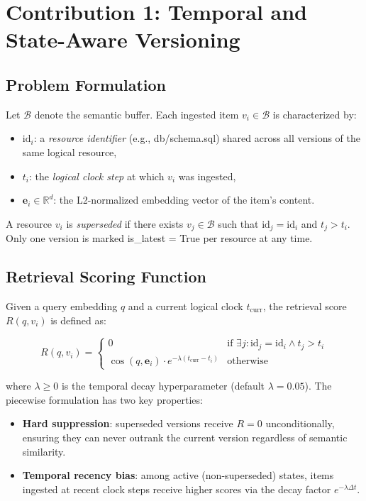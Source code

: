 \documentclass[lettersize,journal]{IEEEtran}
\begin{document}
\section{Contribution 1: Temporal and State-Aware Versioning}

\subsection{Problem Formulation}

Let $\mathcal{B}$ denote the semantic buffer. Each ingested item $v_i \in \mathcal{B}$ is characterized by:
\begin{itemize}
    \item $\text{id}_i$: a \emph{resource identifier} (e.g., db/schema.sql) shared across all versions of the same logical resource,
    \item $t_i$: the \emph{logical clock step} at which $v_i$ was ingested,
    \item $\mathbf{e}_i \in \mathbb{R}^d$: the L2-normalized embedding vector of the item's content.
\end{itemize}

A resource $v_i$ is \emph{superseded} if there exists $v_j \in \mathcal{B}$ such that $\text{id}_j = \text{id}_i$ and $t_j > t_i$. Only one version is marked is\_latest = True per resource at any time.

\subsection{Retrieval Scoring Function}

Given a query embedding $q$ and a current logical clock $t_{\text{curr}}$, the retrieval score $R(q, v_i)$ is defined as:

\begin{equation}
\label{eq:matp_score}
R(q, v_i) = \begin{cases}
0 & \text{if } \exists j : \text{id}_j = \text{id}_i \wedge t_j > t_i \\
\cos(q, \mathbf{e}_i) \cdot e^{-\lambda(t_{\text{curr}} - t_i)} & \text{otherwise}
\end{cases}
\end{equation}

where $\lambda \geq 0$ is the temporal decay hyperparameter (default $\lambda = 0.05$). The piecewise formulation has two key properties:

\begin{itemize}
    \item \textbf{Hard suppression}: superseded versions receive $R = 0$ unconditionally, ensuring they can never outrank the current version regardless of semantic similarity.
    \item \textbf{Temporal recency bias}: among active (non-superseded) states, items ingested at recent clock steps receive higher scores via the decay factor $e^{-\lambda \Delta t}$.
\end{itemize}
\end{document}
